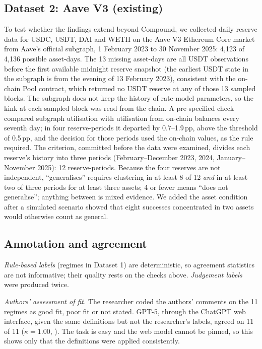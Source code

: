 \documentclass[11pt]{article}
\newcommand{\pp}{\,pp}
\begin{document}
\subsection{Dataset 2: Aave V3 (existing)}

To test whether the findings extend beyond Compound, we collected daily reserve data for USDC, USDT, DAI and WETH on the Aave V3 Ethereum Core market from Aave's official subgraph, 1 February 2023 to 30 November 2025: 4,123 of 4,136 possible asset-days. The 13 missing asset-days are all USDT observations before the first available midnight reserve snapshot (the earliest USDT state in the subgraph is from the evening of 13 February 2023), consistent with the on-chain Pool contract, which returned no USDT reserve at any of those 13 sampled blocks. The subgraph does not keep the history of rate-model parameters, so the kink at each sampled block was read from the chain. A pre-specified check compared subgraph utilisation with utilisation from on-chain balances every seventh day; in four reserve-periods it departed by 0.7--1.9\pp, above the threshold of 0.5\pp, and the decision for those periods used the on-chain values, as the rule required. The criterion, committed before the data were examined, divides each reserve's history into three periods (February--December 2023, 2024, January--November 2025): 12 reserve-periods. Because the four reserves are not independent, ``generalises'' requires clustering in at least 8 of 12 \emph{and} in at least two of three periods for at least three assets; 4 or fewer means ``does not generalise''; anything between is mixed evidence. We added the asset condition after a simulated scenario showed that eight successes concentrated in two assets would otherwise count as general.

\subsection{Annotation and agreement}

\emph{Rule-based labels} (regimes in Dataset 1) are deterministic, so agreement statistics are not informative; their quality rests on the checks above. \emph{Judgement labels} were produced twice.

\emph{Authors' assessment of fit.} The researcher coded the authors' comments on the 11 regimes as good fit, poor fit or not stated. GPT-5, through the ChatGPT web interface, given the same definitions but not the researcher's labels, agreed on 11 of 11 ($\kappa=1.00$, \citealp{cohen1960coefficient}). The task is easy and the web model cannot be pinned, so this shows only that the definitions were applied consistently.
\end{document}
